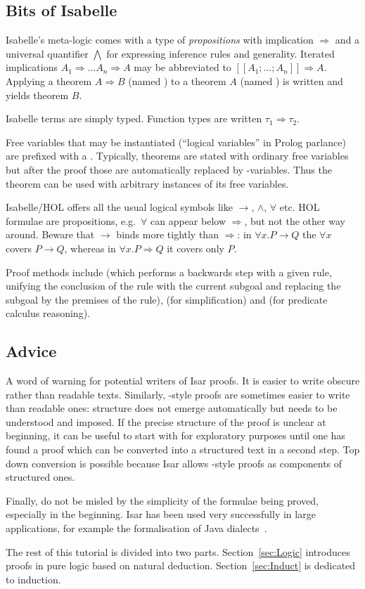 \subsection{Bits of Isabelle}

Isabelle's meta-logic comes with a type of \emph{propositions} with
implication $\Longrightarrow$ and a universal quantifier $\bigwedge$ for expressing
inference rules and generality.  Iterated implications $A_1 \Longrightarrow \dots
A_n \Longrightarrow A$ may be abbreviated to $[\![ A_1; \dots; A_n ]\!] \Longrightarrow A$.
Applying a theorem $A \Longrightarrow B$ (named ) to a theorem $A$ (named
) is written  and yields theorem $B$.

Isabelle terms are simply typed. Function types are
written $\tau_1 \Rightarrow \tau_2$.

Free variables that may be instantiated (``logical variables'' in Prolog
parlance) are prefixed with a . Typically, theorems are stated with
ordinary free variables but after the proof those are automatically replaced
by -variables. Thus the theorem can be used with arbitrary instances
of its free variables.

Isabelle/HOL offers all the usual logical symbols like $\longrightarrow$, $\land$,
$\forall$ etc. HOL formulae are propositions, e.g.\ $\forall$ can appear below
$\Longrightarrow$, but not the other way around. Beware that $\longrightarrow$ binds more
tightly than $\Longrightarrow$: in $\forall x. P \longrightarrow Q$ the $\forall x$ covers $P \longrightarrow Q$, whereas
in $\forall x. P \Longrightarrow Q$ it covers only $P$.

Proof methods include  (which performs a backwards
step with a given rule, unifying the conclusion of the rule with the
current subgoal and replacing the subgoal by the premises of the
rule),  (for simplification) and  (for predicate
calculus reasoning).

\subsection{Advice}

A word of warning for potential writers of Isar proofs.  It
is easier to write obscure rather than readable texts.  Similarly,
-style proofs are sometimes easier to write than readable
ones: structure does not emerge automatically but needs to be
understood and imposed. If the precise structure of the proof is
unclear at beginning, it can be useful to start with  for
exploratory purposes until one has found a proof which can be
converted into a structured text in a second step. Top down conversion
is possible because Isar allows -style proofs as components
of structured ones.

Finally, do not be misled by the simplicity of the formulae being proved,
especially in the beginning. Isar has been used very successfully in
large applications, for example the formalisation of Java
dialects~\cite{KleinN-TOPLAS}.
\medskip

The rest of this tutorial is divided into two parts.
Section~\ref{sec:Logic} introduces proofs in pure logic based on
natural deduction. Section~\ref{sec:Induct} is dedicated to induction.
